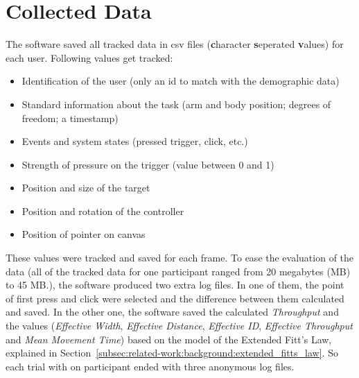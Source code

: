 \section{Collected Data}
\label{sec:results}

The software saved all tracked data in csv files (\textbf{c}haracter \textbf{s}eperated \textbf{v}alues) for each user. Following values get tracked:

\begin{itemize}
    \item Identification of the user (only an id to match with the demographic data)
    \item Standard information about the task (arm and body position; degrees of freedom; a timestamp)
    \item Events and system states (pressed trigger, click, etc.)
    \item Strength of pressure on the trigger (value between 0 and 1)
    \item Position and size of the target
    \item Position and rotation of the controller
    \item Position of pointer on canvas
\end{itemize}

These values were tracked and saved for each frame. To ease the evaluation of the data (all of the tracked data for one participant ranged from 20 megabytes (MB) to 45 MB.), the software produced two extra log files. In one of them, the point of first press and click were selected and the difference between them calculated and saved. In the other one, the software saved the calculated \textit{Throughput} and the values (\textit{Effective Width}, \textit{Effective Distance}, \textit{Effective ID}, \textit{Effective Throughput} and \textit{Mean Movement Time}) based on the model of the Extended Fitt's Law, explained in Section~\ref{subsec:related-work:background:extended_fitts_law}. So each trial with on participant ended with three anonymous log files.

